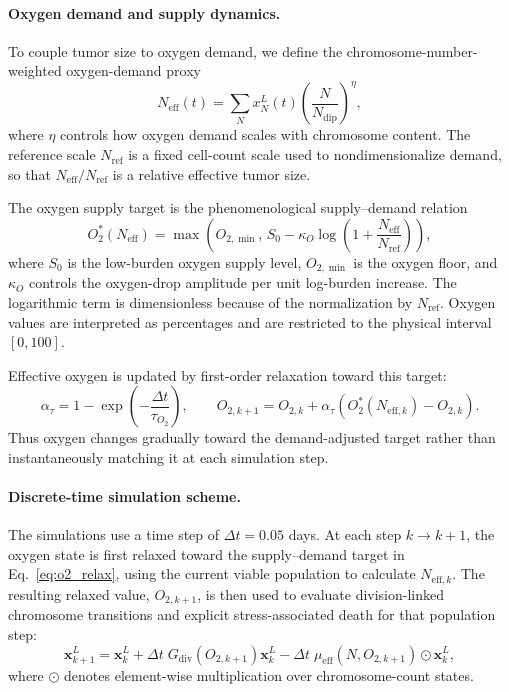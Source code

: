 \documentclass[11pt]{article}
\begin{document}
\paragraph{Oxygen demand and supply dynamics.}

To couple tumor size to oxygen demand, we define the chromosome-number-weighted oxygen-demand proxy
\begin{equation}
N_{\mathrm{eff}}(t)=\sum_N x_N^L(t)\left(\frac{N}{N_{\mathrm{dip}}}\right)^{\eta},
\label{eq:appendix_o2_neff}
\end{equation}
where $\eta$ controls how oxygen demand scales with chromosome content. The reference scale $N_{\mathrm{ref}}$ is a fixed cell-count scale used to nondimensionalize demand, so that $N_{\mathrm{eff}}/N_{\mathrm{ref}}$ is a relative effective tumor size.

The oxygen supply target is the phenomenological supply--demand relation
\begin{equation}
O_2^\ast(N_{\mathrm{eff}})
=
\max\!\left(
O_{2,\min},
\,
S_0
-
\kappa_O \log\!\left(
1+\frac{N_{\mathrm{eff}}}{N_{\mathrm{ref}}}
\right)
\right),
\label{eq:appendix_o2_target}
\end{equation}
where $S_0$ is the low-burden oxygen supply level, $O_{2,\min}$ is the oxygen floor, and $\kappa_O$ controls the oxygen-drop amplitude per unit log-burden increase. The logarithmic term is dimensionless because of the normalization by $N_{\mathrm{ref}}$. Oxygen values are interpreted as percentages and are restricted to the physical interval $[0,100]$.

Effective oxygen is updated by first-order relaxation toward this target:
\begin{equation}
\alpha_{\tau}=1-\exp\!\left(-\frac{\Delta t}{\tau_{O_2}}\right),
\qquad
O_{2,k+1}=O_{2,k}+\alpha_{\tau}\!\left(O_2^\ast(N_{\mathrm{eff},k})-O_{2,k}\right).
\label{eq:o2_relax}
\end{equation}
Thus oxygen changes gradually toward the demand-adjusted target rather than instantaneously matching it at each simulation step.

\paragraph{Discrete-time simulation scheme.}

The simulations use a time step of $\Delta t=0.05$ days. At each step $k\to k+1$, the oxygen state is first relaxed toward the supply--demand target in Eq.~\eqref{eq:o2_relax}, using the current viable population to calculate $N_{\mathrm{eff},k}$. The resulting relaxed value, $O_{2,k+1}$, is then used to evaluate division-linked chromosome transitions and explicit stress-associated death for that population step:
\begin{equation}
\mathbf{x}^{L}_{k+1}
=
\mathbf{x}^{L}_{k}
+
\Delta t\;G_{\mathrm{div}}(O_{2,k+1})\mathbf{x}^{L}_{k}
-
\Delta t\;\mu_{\mathrm{eff}}(N,O_{2,k+1})\odot\mathbf{x}^{L}_{k},
\label{eq:appendix_viable_ode}
\end{equation}
where $\odot$ denotes element-wise multiplication over chromosome-count states.
\end{document}
